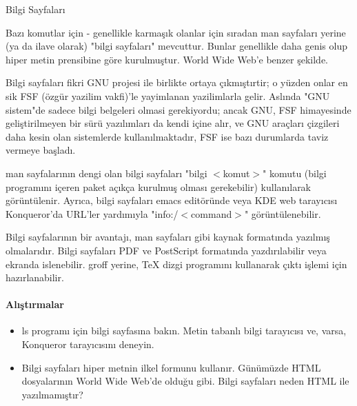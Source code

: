 \begin{section}{Bilgi Sayfaları}

Bazı komutlar için - genellikle karmaşık olanlar için sıradan man sayfaları yerine (ya da ilave olarak) "bilgi sayfaları" mevcuttur. Bunlar genellikle daha genis olup hiper metin prensibine göre kurulmuştur. World Wide Web'e benzer şekilde.

Bilgi sayfaları fikri GNU projesi ile birlikte ortaya çıkmıştırtir; o yüzden onlar en sik FSF (özgür yazilim vakfi)'le yayimlanan yazilimlarla gelir. Aslında "GNU sistem"de sadece bilgi belgeleri olmasi gerekiyordu; ancak GNU, FSF himayesinde geliştirilmeyen bir sürü yazılımları da kendi içine alır, ve GNU araçları çizgileri daha kesin olan sistemlerde kullanılmaktadır, FSF ise bazı durumlarda taviz vermeye başladı.

man sayfalarının dengi olan bilgi sayfaları "bilgi $<$komut$>$" komutu (bilgi programını içeren paket açıkça kurulmuş olması gerekebilir) kullanılarak görüntülenir. Ayrıca, bilgi sayfaları emacs editöründe veya KDE web tarayıcısı Konqueror'da URL'ler yardımıyla "info:/$<$command$>$" görüntülenebilir.

Bilgi sayfalarının bir avantajı, man sayfaları gibi kaynak formatında yazılmış olmalarıdır. Bilgi sayfaları PDF ve PostScript formatında yazdırılabilir veya ekranda islenebilir. groff yerine, \TeX{} dizgi programını kullanarak çıktı işlemi için hazırlanabilir.

\paragraph{Alıştırmalar}{
\begin{itemize}
 \item ls programı için bilgi sayfasına bakın. Metin tabanlı bilgi tarayıcısı ve, varsa, Konqueror tarayıcısını deneyin.
 \item Bilgi sayfaları hiper metnin ilkel formunu kullanır. Günümüzde HTML dosyalarının World Wide Web'de olduğu gibi. Bilgi sayfaları neden HTML ile yazılmamıştır?
\end{itemize}}
\end{section}
